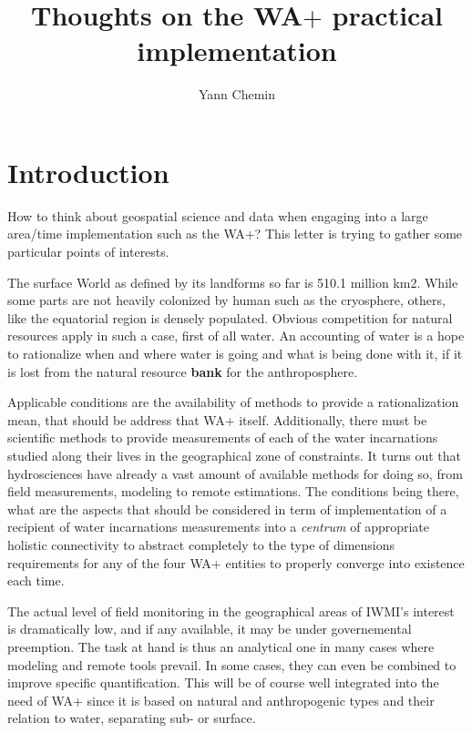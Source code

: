 \documentclass[a4paper,10pt,onecolumn]{article}
\begin{document}
\bigskip
\bigskip
\title{Thoughts on the WA$+$ practical implementation}
\author{Yann Chemin}
\maketitle

\section{Introduction}
How to think about geospatial science and data when engaging into a large area/time implementation such as the WA+?
This letter is trying to gather some particular points of interests.\newline

The surface World as defined by its landforms so far is 510.1 million km2. While some parts are not heavily 
colonized by human such as the cryosphere, others, like the equatorial region is densely populated. 
Obvious competition for natural resources apply in such a case, first of all water. An accounting of water
is a hope to rationalize when and where water is going and what is being done with it, if it is lost from the
natural resource {\bf bank} for the anthroposphere.\newline

Applicable conditions are the availability of methods to provide a rationalization mean, that should be address that WA+
itself.
Additionally, there must be scientific methods to provide measurements of each of the water incarnations studied 
along their lives in the geographical zone of constraints. It turns out that hydrosciences have already a vast 
amount of available methods for doing so, from field measurements, modeling to remote estimations. 
The conditions being there, what are the aspects that should be considered in term of implementation of a recipient
of water incarnations measurements into a {\it centrum} of appropriate holistic connectivity to abstract completely 
to the type of dimensions requirements for any of the four WA+ entities to properly converge into existence each time.
\newline

The actual level of field monitoring in the geographical areas of IWMI's interest is dramatically low, and if any 
available, it may be under governemental preemption. The task at hand is thus an analytical one in many cases where 
modeling and remote tools prevail. In some cases, they can even be combined to improve specific quantification.
This will be of course well integrated into the need of WA+ since it is based on natural and anthropogenic types and
their relation to water, separating sub- or surface.\newline
\end{document}

